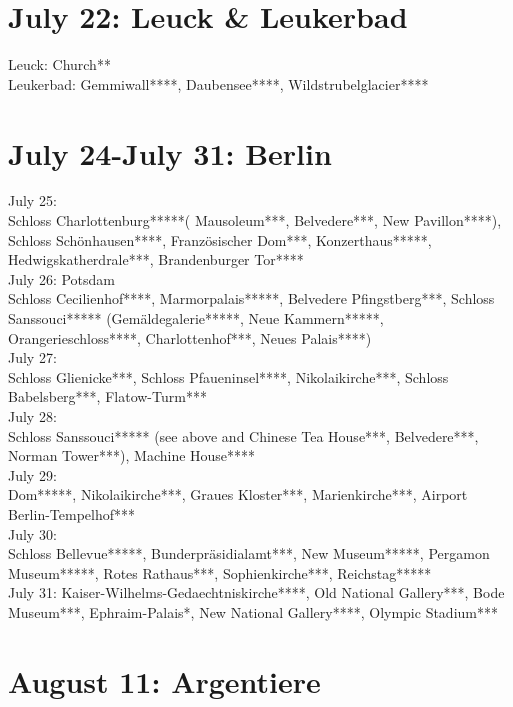 \section{July 22: Leuck \& Leukerbad}
\label{Leuk2012}

Leuck: Church**\\
Leukerbad: Gemmiwall****, Daubensee****, Wildstrubelglacier****

\section{July 24-July 31: Berlin}
\label{Berlin2012}

July 25:\\
Schloss Charlottenburg*****( Mausoleum***, Belvedere***, New Pavillon****), Schloss Sch\"onhausen****, Franz\"osischer Dom***, Konzerthaus*****, Hedwigskatherdrale***, Brandenburger Tor****\\

July 26: Potsdam\\
Schloss Cecilienhof****, Marmorpalais*****, Belvedere Pfingstberg***, Schloss Sanssouci***** (Gem\"aldegalerie*****, Neue Kammern*****, Orangerieschloss****, Charlottenhof***, Neues Palais****)\\

July 27:\\
Schloss Glienicke***, Schloss Pfaueninsel****, Nikolaikirche***, Schloss Babelsberg***, Flatow-Turm***\\

July 28:\\
Schloss Sanssouci***** (see above and Chinese Tea House***, Belvedere***, Norman Tower***), Machine House****\\

July 29:\\
Dom*****, Nikolaikirche***, Graues Kloster***, Marienkirche***, Airport Berlin-Tempelhof***\\

July 30:\\
Schloss Bellevue*****, Bunderpr\"asidialamt***, New Museum*****, Pergamon Museum*****, Rotes Rathaus***, Sophienkirche***, Reichstag*****\\

July 31:
Kaiser-Wilhelms-Gedaechtniskirche****, Old National Gallery***, Bode Museum***, Ephraim-Palais*, New National Gallery****, Olympic Stadium***

\section{August 11: Argentiere}
\label{Argentiere2012}

